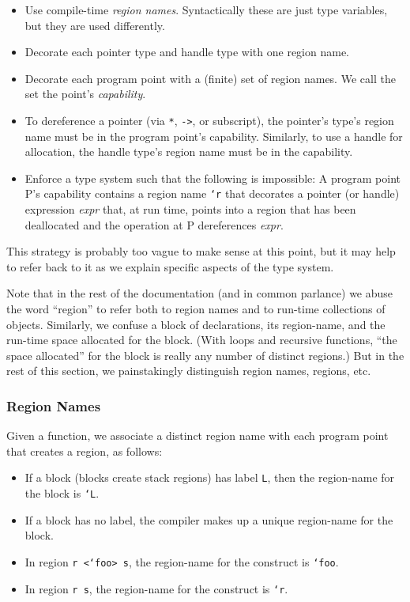 \begin{itemize}
\item Use compile-time \emph{region names}.  Syntactically these are
  just type variables, but they are used differently.
\item Decorate each pointer type and handle type with one region name. 
\item Decorate each program point with a (finite) set of region names.
  We call the set the point's \emph{capability}.
\item To dereference a pointer (via \texttt{*}, \texttt{->}, or
  subscript), the pointer's type's region name must be in the program
  point's capability.  Similarly, to use a handle for allocation, the
  handle type's region name must be in the capability.
\item Enforce a type system such that the following is impossible: A
  program point P's capability contains a region name \texttt{`r} that
  decorates a pointer (or handle) expression \textit{expr} that, at
  run time, points into a region that has been deallocated and the
  operation at P dereferences \textit{expr}.
\end{itemize}

This strategy is probably too vague to make sense at this point, but
it may help to refer back to it as we explain specific aspects of the
type system.

Note that in the rest of the documentation (and in common parlance) we
abuse the word ``region'' to refer both to region names and to
run-time collections of objects.  Similarly, we confuse a block of
declarations, its region-name, and the run-time space allocated for
the block.  (With loops and recursive functions, ``the space
allocated'' for the block is really any number of distinct regions.)
But in the rest of this section, we painstakingly distinguish
region names, regions, etc.

\subsubsection{Region Names}

Given a function, we associate a distinct region name with each
program point that creates a region, as follows:

\begin{itemize}
\item If a block (blocks create stack regions) has label \texttt{L},
  then the region-name for the block is \texttt{`L}.
\item If a block has no label, the compiler makes up a unique
  region-name for the block.
\item In region \texttt{r <`foo> s}, the region-name for the construct
  is \texttt{`foo}.
\item In region \texttt{r s}, the region-name for the construct is
  \texttt{`r}.
\end{itemize}

